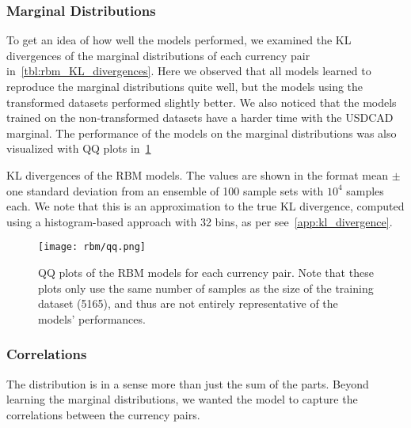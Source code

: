 \subsubsection{Marginal Distributions}
To get an idea of how well the models performed, we examined the KL divergences of the marginal distributions of each currency pair in~\cref{tbl:rbm_KL_divergences}.
Here we observed that all models learned to reproduce the marginal distributions quite well, but the models using the transformed datasets performed slightly better.
We also noticed that the models trained on the non-transformed datasets have a harder time with the USDCAD marginal.
The performance of the models on the marginal distributions was also visualized with QQ plots in~\cref{fig:rbm_qq_plots}
\begin{table}[!htb]
    \centering
    \begin{adjustbox}{max width=\textwidth}
        
    \end{adjustbox}
    \caption{
        KL divergences of the RBM models.
        The values are shown in the format mean \(\pm\) one standard deviation from an ensemble of 100 sample sets with \( 10^4 \) samples each.
        We note that this is an approximation to the true KL divergence, computed using a histogram-based approach with 32 bins, as per see~\cref{app:kl_divergence}.
    }
    \label{tbl:rbm_KL_divergences}
\end{table}
\begin{figure}[!htb]
    \begin{center}
        \texttt{[image: rbm/qq.png]}
    \end{center}
    \caption{QQ plots of the RBM models for each currency pair. Note that these plots only use the same number of samples as the size of the training dataset (5165), and thus are not entirely representative of the models' performances.}
    \label{fig:rbm_qq_plots}
\end{figure}

\subsubsection{Correlations}
The distribution is in a sense more than just the sum of the parts.
Beyond learning the marginal distributions, we wanted the model to capture the correlations between the currency pairs.

